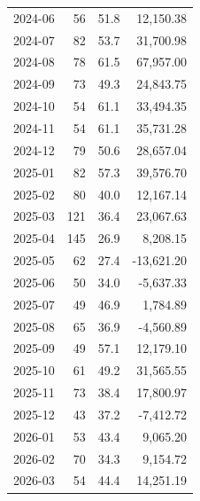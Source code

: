 \documentclass[11pt,a4paper,twoside]{article}
\begin{document}
\begin{center}
\begin{tabular}{>{\color{txtmain}}l rrr}
2024-06 & 56 & 51.8 & \textcolor{wingreen}{12,150.38} \\
2024-07 & 82 & 53.7 & \textcolor{wingreen}{31,700.98} \\
2024-08 & 78 & 61.5 & \textcolor{wingreen}{67,957.00} \\
2024-09 & 73 & 49.3 & \textcolor{wingreen}{24,843.75} \\
2024-10 & 54 & 61.1 & \textcolor{wingreen}{33,494.35} \\
2024-11 & 54 & 61.1 & \textcolor{wingreen}{35,731.28} \\
2024-12 & 79 & 50.6 & \textcolor{wingreen}{28,657.04} \\
2025-01 & 82 & 57.3 & \textcolor{wingreen}{39,576.70} \\
2025-02 & 80 & 40.0 & \textcolor{wingreen}{12,167.14} \\
2025-03 & 121 & 36.4 & \textcolor{wingreen}{23,067.63} \\
2025-04 & 145 & 26.9 & \textcolor{wingreen}{8,208.15} \\
2025-05 & 62 & 27.4 & \textcolor{lossred}{-13,621.20} \\
2025-06 & 50 & 34.0 & \textcolor{lossred}{-5,637.33} \\
2025-07 & 49 & 46.9 & \textcolor{wingreen}{1,784.89} \\
2025-08 & 65 & 36.9 & \textcolor{lossred}{-4,560.89} \\
2025-09 & 49 & 57.1 & \textcolor{wingreen}{12,179.10} \\
2025-10 & 61 & 49.2 & \textcolor{wingreen}{31,565.55} \\
2025-11 & 73 & 38.4 & \textcolor{wingreen}{17,800.97} \\
2025-12 & 43 & 37.2 & \textcolor{lossred}{-7,412.72} \\
2026-01 & 53 & 43.4 & \textcolor{wingreen}{9,065.20} \\
2026-02 & 70 & 34.3 & \textcolor{wingreen}{9,154.72} \\
2026-03 & 54 & 44.4 & \textcolor{wingreen}{14,251.19} \\
\bottomrule
\end{tabular}
\end{center}
\end{document}
